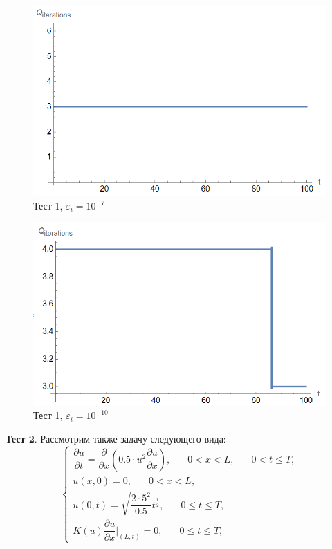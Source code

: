 \documentclass[12pt, a4paper]{article}
\begin{document}
 \begin{figure}[H]
	\centering
	\includegraphics[width=1\textwidth]{test1-1e-7}
	\caption{Тест 1, $\varepsilon_i=10^{-7}$}
\end{figure}
	
	 \begin{figure}[H]
		\centering
		\includegraphics[width=1\textwidth]{test1-1e-10}
		\caption{Тест 1, $\varepsilon_i=10^{-10}$}
	\end{figure}
	
	

	\textbf{Тест 2}. Рассмотрим также задачу следующего вида:
		\[
	\begin{cases}
		\dfrac{\partial u}{\partial t} = \dfrac{\partial}{\partial x}\left(0.5\cdot u^2\dfrac{\partial u}{\partial x} \right), \phantom{xxx} 0<x<L, \phantom{xxx} 0<t\le T, \\
		u(x,0) = 0, \phantom{xxx} 0<x<L,\\
		u(0,t) = \sqrt{\dfrac{2\cdot5^2}{0.5}}t^{\frac12}, \phantom{xxx} 0 \le t \le T,\\
		K(u)\dfrac{\partial u}{\partial x}|_{(L,t)}=0, \phantom{xxx} 0 \le t \le T,
	\end{cases}
	\]
	
\end{document}
